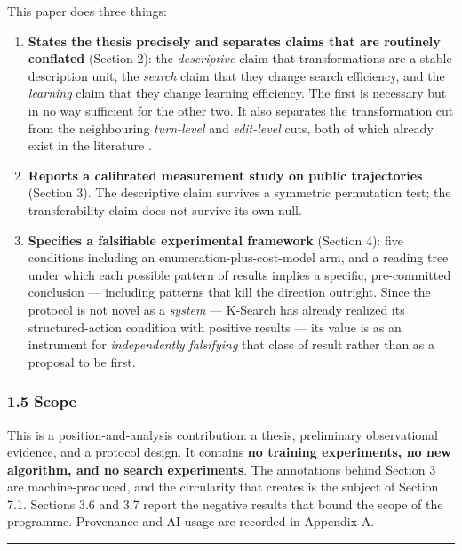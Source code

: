 \documentclass[
  11pt,
]{article}
\providecommand{\tightlist}{%
  \setlength{\itemsep}{0pt}\setlength{\parskip}{0pt}}
\begin{document}
This paper does three things:

\begin{enumerate}
\def\labelenumi{\arabic{enumi}.}
\tightlist
\item
  \textbf{States the thesis precisely and separates claims that are routinely conflated} (Section 2): the \emph{descriptive} claim that transformations are a stable description unit, the \emph{search} claim that they change search efficiency, and the \emph{learning} claim that they change learning efficiency. The first is necessary but in no way sufficient for the other two. It also separates the transformation cut from the neighbouring \emph{turn-level} and \emph{edit-level} cuts, both of which already exist in the literature \cite{cuasmrl30,kevin32}.
\item
  \textbf{Reports a calibrated measurement study on public trajectories} (Section 3). The descriptive claim survives a symmetric permutation test; the transferability claim does not survive its own null.
\item
  \textbf{Specifies a falsifiable experimental framework} (Section 4): five conditions including an enumeration-plus-cost-model arm, and a reading tree under which each possible pattern of results implies a specific, pre-committed conclusion --- including patterns that kill the direction outright. Since the protocol is not novel as a \emph{system} --- K-Search has already realized its structured-action condition with positive results \cite{ksearch29} --- its value is as an instrument for \emph{independently falsifying} that class of result rather than as a proposal to be first.
\end{enumerate}

\hypertarget{scope}{%
\subsubsection{1.5 Scope}\label{scope}}

This is a position-and-analysis contribution: a thesis, preliminary observational evidence, and a protocol design. It contains \textbf{no training experiments, no new algorithm, and no search experiments}. The annotations behind Section 3 are machine-produced, and the circularity that creates is the subject of Section 7.1. Sections 3.6 and 3.7 report the negative results that bound the scope of the programme. Provenance and AI usage are recorded in Appendix A.

\begin{center}\rule{0.5\linewidth}{0.5pt}\end{center}
\end{document}

